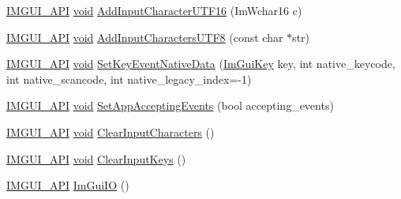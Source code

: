 \begin{DoxyCompactItemize}
\item 
\hyperlink{imgui_8h_a43829975e84e45d1149597467a14bbf5}{I\+M\+G\+U\+I\+\_\+\+A\+PI} \hyperlink{imgui__impl__opengl3__loader_8h_ac668e7cffd9e2e9cfee428b9b2f34fa7}{void} \hyperlink{structImGuiIO_a09ce496becb406f0fbe94dc35915af64}{Add\+Input\+Character\+U\+T\+F16} (Im\+Wchar16 c)
\item 
\hyperlink{imgui_8h_a43829975e84e45d1149597467a14bbf5}{I\+M\+G\+U\+I\+\_\+\+A\+PI} \hyperlink{imgui__impl__opengl3__loader_8h_ac668e7cffd9e2e9cfee428b9b2f34fa7}{void} \hyperlink{structImGuiIO_abf60d6dc365fab19136059f64680bdcc}{Add\+Input\+Characters\+U\+T\+F8} (const char $\ast$str)
\item 
\hyperlink{imgui_8h_a43829975e84e45d1149597467a14bbf5}{I\+M\+G\+U\+I\+\_\+\+A\+PI} \hyperlink{imgui__impl__opengl3__loader_8h_ac668e7cffd9e2e9cfee428b9b2f34fa7}{void} \hyperlink{structImGuiIO_a6b2fa57fb6af5aa1c99f58115542e1dc}{Set\+Key\+Event\+Native\+Data} (\hyperlink{imgui_8h_aa22ffe36b188427d712447ec465203d4}{Im\+Gui\+Key} key, int native\+\_\+keycode, int native\+\_\+scancode, int native\+\_\+legacy\+\_\+index=-\/1)
\item 
\hyperlink{imgui_8h_a43829975e84e45d1149597467a14bbf5}{I\+M\+G\+U\+I\+\_\+\+A\+PI} \hyperlink{imgui__impl__opengl3__loader_8h_ac668e7cffd9e2e9cfee428b9b2f34fa7}{void} \hyperlink{structImGuiIO_a8ec563cbffee4818a89840654b8c4404}{Set\+App\+Accepting\+Events} (bool accepting\+\_\+events)
\item 
\hyperlink{imgui_8h_a43829975e84e45d1149597467a14bbf5}{I\+M\+G\+U\+I\+\_\+\+A\+PI} \hyperlink{imgui__impl__opengl3__loader_8h_ac668e7cffd9e2e9cfee428b9b2f34fa7}{void} \hyperlink{structImGuiIO_a82d8794e14e628efbb026af4202c70ca}{Clear\+Input\+Characters} ()
\item 
\hyperlink{imgui_8h_a43829975e84e45d1149597467a14bbf5}{I\+M\+G\+U\+I\+\_\+\+A\+PI} \hyperlink{imgui__impl__opengl3__loader_8h_ac668e7cffd9e2e9cfee428b9b2f34fa7}{void} \hyperlink{structImGuiIO_a5d87fb4f10e366ef8a4603ac57e39da1}{Clear\+Input\+Keys} ()
\item 
\hyperlink{imgui_8h_a43829975e84e45d1149597467a14bbf5}{I\+M\+G\+U\+I\+\_\+\+A\+PI} \hyperlink{structImGuiIO_a0ad8d993e50108b81b0d279d2d43f69d}{Im\+Gui\+IO} ()
\end{DoxyCompactItemize}
